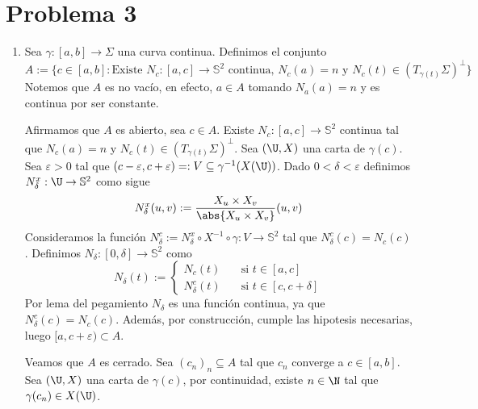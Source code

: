 \documentclass{article}
\begin{document}
\section*{Problema 3}
\begin{enumerate}
    \item Sea $\gamma:[a,b]\to\Sigma$ una curva continua. Definimos el conjunto
    \begin{equation*}
        A:=\{c\in[a,b]:\text{Existe }N_{c}:[a,c]\to\mathbb{S}^{2}\text{ continua, }
        N_{c}(a)=n\text{ y }N_{c}(t)\in(T_{\gamma(t)}\Sigma)^{\perp}\}
    \end{equation*}
    Notemos que $A$ es no vacío, en efecto, $a\in A$ tomando $N_{a}(a)=n$ y es continua por ser
    constante. 
    
    \noindent Afirmamos que $A$ es abierto, sea $c\in A$. Existe $N_{c}:[a,c]\to\mathbb{S}^{2}$
    continua tal que $N_{c}(a)=n$ y $N_{c}(t)\in(T_{\gamma(t)}\Sigma)^{\perp}$. Sea $(\U,X)$ una 
    carta de $\gamma(c)$. Sea $\varepsilon>0$ tal que $(c-\varepsilon,c+\varepsilon)
    =:V\subseteq\gamma^{-1}(X(\U))$. Dado $0<\delta<\varepsilon$ definimos $N_{\delta}^{x}:
    \U\to\mathbb{S}^{2}$ como sigue
    \begin{equation*}
        N_{\delta}^{x}(u,v):=\frac{X_{u}\times X_{v}}{\abs{X_{u}\times X_{v}}}(u,v)
    \end{equation*}
    Consideramos la función $N_{\delta}^{c}:=N_{\delta}^{x}\circ X^{-1}\circ
    \gamma:V\to\mathbb{S}^{2}$ tal que $N_{\delta}^{c}(c)=N_{c}(c)$. Definimos 
    $N_{\delta}:[0,\delta]\to\mathbb{S}^{2}$ como
    \begin{equation*}
        N_{\delta}(t):=\begin{cases}
            N_{c}(t) &\quad\text{si }t\in[a,c] \\
            N_{\delta}^{c}(t) &\quad\text{si }t\in[c,c+\delta]
        \end{cases}
    \end{equation*}
    Por lema del pegamiento $N_{\delta}$ es una función continua, ya que 
    $N_{\delta}^{c}(c)=N_{c}(c)$. Además, por construcción, cumple las hipotesis necesarias, luego
    $[a,c+\varepsilon)\subset A$.

    \noindent Veamos que $A$ es cerrado. Sea $(c_{n})_{n}\subseteq A$ tal que 
    $c_{n}$ converge a $c\in[a,b]$. Sea $(\U,X)$ una carta de $\gamma(c)$, por 
    continuidad, existe $n\in\N$ tal que $\gamma(c_{n})\in X(\U)$. 
    

\end{enumerate}
\end{document}
